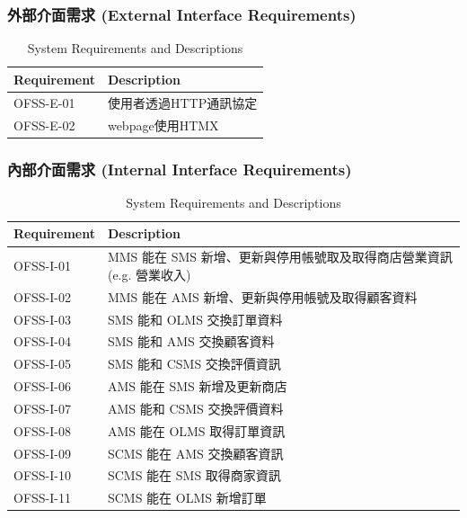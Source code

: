 \documentclass[a4paper, 12pt]{article}
\begin{document}
\subsubsection{外部介面需求 (External Interface Requirements)}
\begin{table}[h]
    \centering
    \renewcommand{\arraystretch}{1.35}
    \begin{tabular}{|p{3cm}|p{10cm}|}
        \hline
        \textbf{Requirement} & \textbf{Description} \\
        \hline
        OFSS-E-01 & 使用者透過HTTP通訊協定 \\
        \hline
        OFSS-E-02 & webpage使用HTMX \\
        \hline
    \end{tabular}
    \caption{System Requirements and Descriptions}
    \label{tab:system-requirements}
\end{table}
\newpage
\subsubsection{內部介面需求 (Internal Interface Requirements)}
\begin{table}[h]
    \centering
    \renewcommand{\arraystretch}{1.35}
    \begin{tabular}{|p{3cm}|p{10cm}|}
        \hline
        \textbf{Requirement} & \textbf{Description} \\
        \hline
        OFSS-I-01 & MMS 能在 SMS 新增、更新與停用帳號取及取得商店營業資訊(e.g. 營業收入) \\
        \hline
        OFSS-I-02 & MMS 能在 AMS 新增、更新與停用帳號及取得顧客資料  \\
        \hline
        OFSS-I-03 & SMS 能和 OLMS 交換訂單資料 \\
        \hline
        OFSS-I-04 & SMS 能和 AMS 交換顧客資料 \\
        \hline
        OFSS-I-05 & SMS 能和 CSMS 交換評價資訊 \\
        \hline
        OFSS-I-06 & AMS 能在 SMS 新增及更新商店 \\
        \hline
        OFSS-I-07 & AMS 能和 CSMS 交換評價資料 \\
        \hline
        OFSS-I-08 & AMS 能在 OLMS 取得訂單資訊 \\
        \hline
        OFSS-I-09 & SCMS 能在 AMS 交換顧客資訊 \\
        \hline
        OFSS-I-10 & SCMS 能在 SMS 取得商家資訊 \\
        \hline
        OFSS-I-11 & SCMS 能在 OLMS 新增訂單\\
        \hline
        
    \end{tabular}
    \caption{System Requirements and Descriptions}
    \label{tab:system-requirements}
\end{table}
\end{document}
